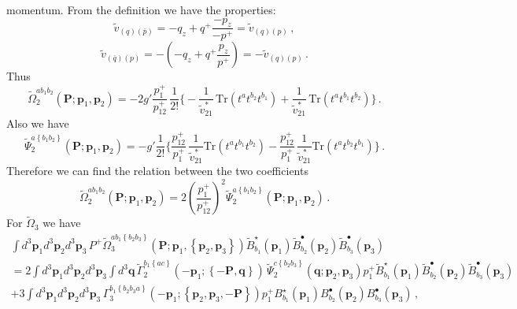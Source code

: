 \documentclass[english,american]{article}
\begin{document}
momentum. From the definition we have the properties:
\begin{equation}
\tilde{v}_{\left(q\right)\left(\overline{p}\right)}=-q_{z}+q^{+}\frac{-p_{z}}{-p^{+}}=\tilde{v}_{\left(q\right)\left(p\right)}\,,\label{eq:vtild_bar1}
\end{equation}
\begin{equation}
\tilde{v}_{\left(\overline{q}\right)\left(p\right)}=-\left(-q_{z}+q^{+}\frac{p_{z}}{p^{+}}\right)=-\tilde{v}_{\left(q\right)\left(p\right)}\,.\label{eq:vtild_bar2}
\end{equation}
Thus
\begin{equation}
\tilde{\Omega}_{2}^{ab_{1}b_{2}}\left(\mathbf{P};\mathbf{p}_{1},\mathbf{p}_{2}\right)=-2g'\frac{p_{1}^{+}}{p_{12}^{+}}\,\frac{1}{2!}\Bigg\{-\frac{1}{\tilde{v}_{21}^{*}}\,\mathrm{Tr}\left(t^{a}t^{b_{2}}t^{b_{1}}\right)+\frac{1}{\tilde{v}_{21}^{*}}\,\mathrm{Tr}\left(t^{a}t^{b_{1}}t^{b_{2}}\right)\Bigg\}\,.
\end{equation}
Also we have
\begin{equation}
\tilde{\Psi}_{2}^{a\left\{ b_{1}b_{2}\right\} }\left(\mathbf{P};\mathbf{p}_{1},\mathbf{p}_{2}\right)=-g'\frac{1}{2!}\Bigg\{\frac{p_{12}^{+}}{p_{1}^{+}}\,\frac{1}{\tilde{v}_{21}^{*}}\mathrm{Tr}\left(t^{a}t^{b_{1}}t^{b_{2}}\right)-\frac{p_{12}^{+}}{p_{1}^{+}}\,\frac{1}{\tilde{v}_{21}^{*}}\mathrm{Tr}\left(t^{a}t^{b_{2}}t^{b_{1}}\right)\Bigg\}\,.
\end{equation}
Therefore we can find the relation between the two coefficients
\begin{equation}
\tilde{\Omega}_{2}^{ab_{1}b_{2}}\left(\mathbf{P};\mathbf{p}_{1},\mathbf{p}_{2}\right)=2\left(\frac{p_{1}^{+}}{p_{12}^{+}}\right)^{2}\tilde{\Psi}_{2}^{a\left\{ b_{1}b_{2}\right\} }\left(\mathbf{P};\mathbf{p}_{1},\mathbf{p}_{2}\right)\,.
\end{equation}
For $\tilde{\Omega}_{3}$ we have
\begin{multline}
\int d^{3}\mathbf{p}_{1}d^{3}\mathbf{p}_{2}d^{3}\mathbf{p}_{3}\, P^{+}\tilde{\Omega}_{3}^{ab_{1}\left\{ b_{2}b_{3}\right\} }\left(\mathbf{P};\mathbf{p}_{1},\left\{ \mathbf{p}_{2},\mathbf{p}_{3}\right\} \right)\tilde{B}_{b_{1}}^{\star}\left(\mathbf{p}_{1}\right)\tilde{B}_{b_{2}}^{\bullet}\left(\mathbf{p}_{2}\right)\tilde{B}_{b_{3}}^{\bullet}\left(\mathbf{p}_{3}\right)\\
=2\int d^{3}\mathbf{p}_{1}d^{3}\mathbf{p}_{2}d^{3}\mathbf{p}_{3}\int d^{3}\mathbf{q}\,\tilde{\Gamma}_{2}^{b_{1}\left\{ ac\right\} }\left(-\mathbf{p}_{1};\left\{ -\mathbf{P},\mathbf{q}\right\} \right)\,\tilde{\Psi}_{2}^{c\left\{ b_{2}b_{3}\right\} }\left(\mathbf{q};\mathbf{p}_{2},\mathbf{p}_{3}\right)p_{1}^{+}\tilde{B}_{b_{1}}^{\star}\left(\mathbf{p}_{1}\right)\tilde{B}_{b_{2}}^{\bullet}\left(\mathbf{p}_{2}\right)\tilde{B}_{b_{3}}^{\bullet}\left(\mathbf{p}_{3}\right)\\
+3\int d^{3}\mathbf{p}_{1}d^{3}\mathbf{p}_{2}d^{3}\mathbf{p}_{3}\,\Gamma_{3}^{b_{1}\left\{ b_{2}b_{3}a\right\} }\left(-\mathbf{p}_{1};\left\{ \mathbf{p}_{2},\mathbf{p}_{3},-\mathbf{P}\right\} \right)p_{1}^{+}B_{b_{1}}^{\star}\left(\mathbf{p}_{1}\right)B_{b_{2}}^{\bullet}\left(\mathbf{p}_{2}\right)B_{b_{3}}^{\bullet}\left(\mathbf{p}_{3}\right)\,,
\end{multline}
\end{document}
